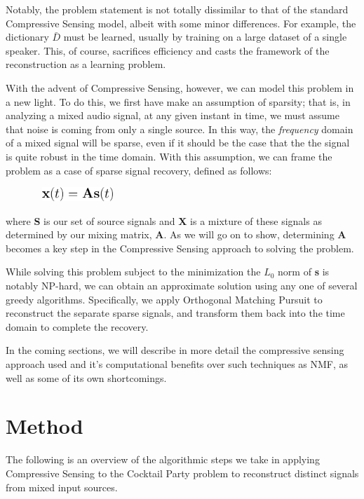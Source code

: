 \documentclass{article}
\begin{document}
Notably, the problem statement is not totally dissimilar to that of the standard Compressive Sensing model, albeit with some minor differences. For example, the dictionary $\bar{D}$ must be learned, usually by training on a large dataset of a single speaker. This, of course, sacrifices efficiency and casts the framework of the reconstruction as a learning problem.  

With the advent of Compressive Sensing, however, we can model this problem in a new light. To do this, we first have make an assumption of sparsity; that is, in analyzing a mixed audio signal, at any given instant in time, we must assume that noise is coming from only a single source. In this way, the {\it frequency} domain of a mixed signal will be sparse, even if it should be the case that the the signal is quite robust in the time domain. With this assumption, we can frame the problem as a case of sparse signal recovery, defined as follows:

\begin{figure}[H]
	\centering
	\includegraphics[width=94pt, height=15pt]{figs/compressive.png}
	\label{Compressive Sensing Problem Statement}
\end{figure}

where \textbf{S} is our set of source signals and \textbf{X} is a mixture of these signals as determined by our mixing matrix, \textbf{A}. As we will go on to show, determining \textbf{A} becomes a key step in the Compressive Sensing approach to solving the problem.

While solving this problem subject to the minimization the $L_{0}$ norm of \textbf{s} is notably NP-hard, we can obtain an approximate solution using any one of several greedy algorithms. Specifically, we apply Orthogonal Matching Pursuit to reconstruct the separate sparse signals, and transform them back into the time domain to complete the recovery.

In the coming sections, we will describe in more detail the compressive sensing approach used and it's computational benefits over such techniques as NMF, as well as some of its own shortcomings.


\section{Method}
The following is an overview of the algorithmic steps we take in applying Compressive Sensing to the Cocktail Party problem to reconstruct distinct signals from mixed input sources.
\end{document}
